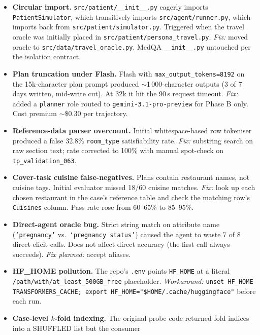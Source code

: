 \documentclass[11pt,a4paper]{article}
\begin{document}
\begin{itemize}[leftmargin=2em, itemsep=2pt]
\item \textbf{Circular import.} \texttt{src/patient/\_\_init\_\_.py} eagerly
    imports \texttt{PatientSimulator}, which transitively imports
    \texttt{src/agent/runner.py}, which imports back from
    \texttt{src/patient/simulator.py}. Triggered when the travel oracle was
    initially placed in \texttt{src/patient/persona\_travel.py}.
    \emph{Fix:} moved oracle to \texttt{src/data/travel\_oracle.py}.
    MedQA \texttt{\_\_init\_\_.py} untouched per the isolation contract.
\item \textbf{Plan truncation under Flash.} Flash with
    \texttt{max\_output\_tokens=8192} on the 15k-character plan prompt
    produced $\sim$1\,000-character outputs (3 of 7 days written, mid-write
    cut). At 32k it hit the 90\,s request timeout. \emph{Fix:} added a
    \texttt{planner} role routed to \texttt{gemini-3.1-pro-preview} for
    Phase B only. Cost premium $\sim$\$0.30 per trajectory.
\item \textbf{Reference-data parser overcount.} Initial whitespace-based row
    tokeniser produced a false 32.8\% \texttt{room\_type} satisfiability
    rate. \emph{Fix:} substring search on raw section text; rate corrected
    to 100\% with manual spot-check on \texttt{tp\_validation\_063}.
\item \textbf{Cover-task cuisine false-negatives.} Plans contain restaurant
    names, not cuisine tags. Initial evaluator missed 18/60 cuisine
    matches. \emph{Fix:} look up each chosen restaurant in the case's
    reference table and check the matching row's \texttt{Cuisines} column.
    Pass rate rose from 60--65\% to 85--95\%.
\item \textbf{Direct-agent oracle bug.} Strict string match on attribute
    name (\texttt{`pregnancy'} vs.\ \texttt{`pregnancy status'}) caused the
    agent to waste 7 of 8 direct-elicit calls. Does not affect direct
    accuracy (the first call always succeeds). \emph{Fix planned:} accept
    aliases.
\item \textbf{HF\_HOME pollution.} The repo's \texttt{.env} points
    \texttt{HF\_HOME} at a literal \texttt{/path/with/at\_least\_500GB\_free}
    placeholder. \emph{Workaround:} \texttt{unset HF\_HOME
    TRANSFORMERS\_CACHE; export HF\_HOME="\$HOME/.cache/huggingface"}
    before each run.
\item \textbf{Case-level $k$-fold indexing.} The original probe code
    returned fold indices into a SHUFFLED list but the consumer

\end{itemize}
\end{document}
